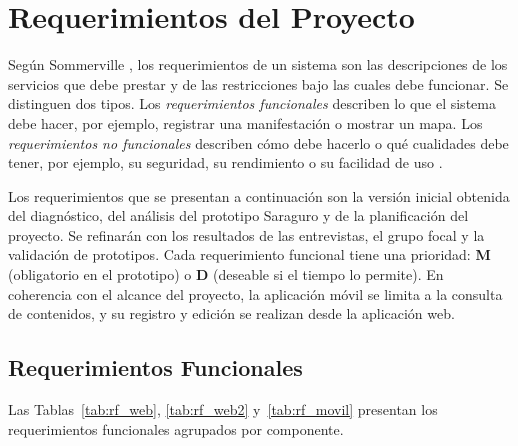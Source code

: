 \section{Requerimientos del Proyecto}
Según Sommerville \cite{sommerville2016software}, los requerimientos de un sistema son las descripciones de los servicios que debe prestar y de las restricciones bajo las cuales debe funcionar. Se distinguen dos tipos. Los \textit{requerimientos funcionales} describen lo que el sistema debe hacer, por ejemplo, registrar una manifestación o mostrar un mapa. Los \textit{requerimientos no funcionales} describen cómo debe hacerlo o qué cualidades debe tener, por ejemplo, su seguridad, su rendimiento o su facilidad de uso \cite{sommerville2016software}.

Los requerimientos que se presentan a continuación son la versión inicial obtenida del diagnóstico, del análisis del prototipo Saraguro y de la planificación del proyecto. Se refinarán con los resultados de las entrevistas, el grupo focal y la validación de prototipos. Cada requerimiento funcional tiene una prioridad: \textbf{M} (obligatorio en el prototipo) o \textbf{D} (deseable si el tiempo lo permite). En coherencia con el alcance del proyecto, la aplicación móvil se limita a la consulta de contenidos, y su registro y edición se realizan desde la aplicación web.

\subsection{Requerimientos Funcionales}
Las Tablas~\ref{tab:rf_web}, \ref{tab:rf_web2} y~\ref{tab:rf_movil} presentan los requerimientos funcionales agrupados por componente.

